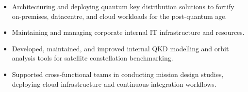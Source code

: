 \documentclass[10.5pt,a4paper,ragged2e]{altacv}
\begin{document}

\begin{fullwidth}
\makecvheader
\end{fullwidth}

\bigskip








\begin{itemize}
\item Architecturing and deploying quantum key distribution solutions to fortify on-premises, datacentre, and cloud workloads for the post-quantum age.
\item Maintaining and managing corporate internal IT infrastructure and resources.
\item Developed, maintained, and improved internal QKD modelling and orbit analysis tools for satellite constellation benchmarking.
\item Supported cross-functional teams in conducting mission design studies, deploying cloud infrastructure and continuous integration workflows.
\end{itemize}
\end{document}
